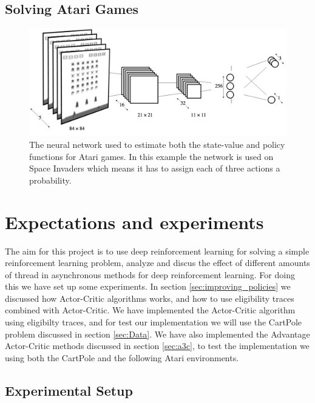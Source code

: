 \documentclass[11pt]{article}
\begin{document}
\subsection{Solving Atari Games}


\begin{figure}[H]
    \centering
    \includegraphics[scale=0.25]{include/Atari_network.png}
    \caption{The neural network used to estimate both the state-value
             and policy functions for Atari games. In this example the network
             is used on Space Invaders which means it has to assign each of three actions a probability.}
    \label{fig:atari_network}
\end{figure}

\section{Expectations and experiments}



The aim for this project is to use deep reinforcement learning for solving a simple reinforcement learning problem, analyze and discus the effect of different amounts of thread in asynchronous methods for deep reinforcement learning. For doing this we have set up some experiments. In section \ref{sec:improving_policies} we discussed how Actor-Critic algorithms works, and how to use eligibility traces combined with Actor-Critic. We have implemented the Actor-Critic algorithm using eligibilty traces, and for test our implementation we will use the CartPole problem discussed in section \ref{sec:Data}. We have also implemented the Advantage Actor-Critic methods discussed in section \ref{sec:a3c}, to test the implementation we using both the CartPole and the following Atari environments.

\subsection{Experimental Setup}
\end{document}

